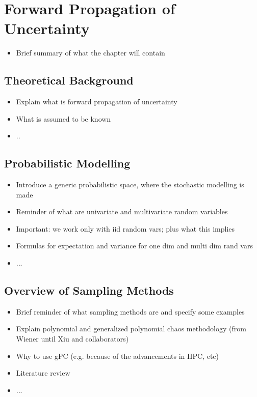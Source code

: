 \chapter{Forward Propagation of Uncertainty}
\label{chapter:Forward Propagation of Uncertainty}
\begin{itemize}
\item Brief summary of what the chapter will contain
\end{itemize}
\section{Theoretical Background}
\label{sec:Theoretical Background}
\begin{itemize}
\item Explain what is forward propagation of uncertainty
\item What is assumed to be known
\item ..
\end{itemize}
\section{Probabilistic Modelling}
\label{sec:Probabilistic Modelling}
\begin{itemize}
\item Introduce a generic probabilistic space, where the stochastic modelling is made
\item Reminder of what are univariate and multivariate random variables
\item Important: we work only with iid random vars; plus what this implies
\item Formulas for expectation and variance for one dim and multi dim rand vars
\item ...
\end{itemize}	
\section{Overview of Sampling Methods}
\label{sec:Overview of Sampling Methods}
\begin{itemize}
\item Brief reminder of what sampling methods are and specify some examples
\item Explain polynomial and generalized polynomial chaos methodology (from Wiener until Xiu and collaborators)
\item Why to use gPC (e.g. because of the advancements in HPC, etc)
\item Literature review
\item ...
\end{itemize}	

